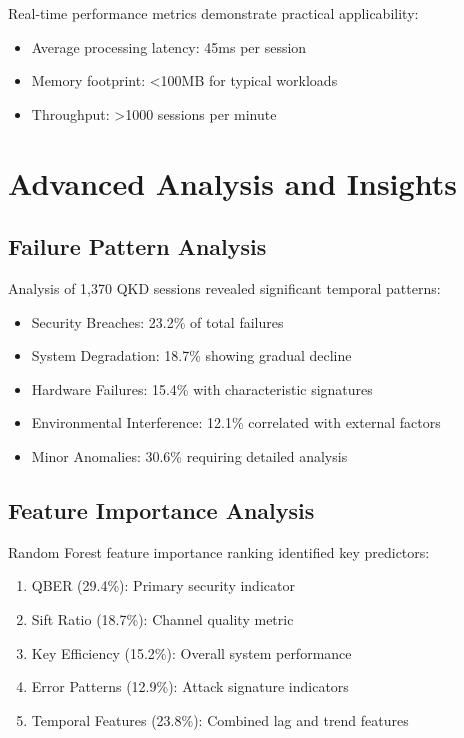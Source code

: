 \documentclass[12pt,a4paper]{article}
\begin{document}
Real-time performance metrics demonstrate practical applicability:
\begin{itemize}
    \item Average processing latency: 45ms per session
    \item Memory footprint: <100MB for typical workloads
    \item Throughput: >1000 sessions per minute
\end{itemize}

\section{Advanced Analysis and Insights}

\subsection{Failure Pattern Analysis}

Analysis of 1,370 QKD sessions revealed significant temporal patterns:
\begin{itemize}
    \item Security Breaches: 23.2\% of total failures
    \item System Degradation: 18.7\% showing gradual decline
    \item Hardware Failures: 15.4\% with characteristic signatures
    \item Environmental Interference: 12.1\% correlated with external factors
    \item Minor Anomalies: 30.6\% requiring detailed analysis
\end{itemize}

\subsection{Feature Importance Analysis}

Random Forest feature importance ranking identified key predictors:
\begin{enumerate}
    \item QBER (29.4\%): Primary security indicator
    \item Sift Ratio (18.7\%): Channel quality metric
    \item Key Efficiency (15.2\%): Overall system performance
    \item Error Patterns (12.9\%): Attack signature indicators
    \item Temporal Features (23.8\%): Combined lag and trend features
\end{enumerate}
\end{document}

